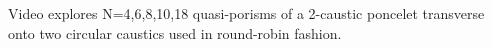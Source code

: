 Video explores N=4,6,8,10,18 quasi-porisms of a 2-caustic poncelet transverse onto two circular caustics used in round-robin fashion.